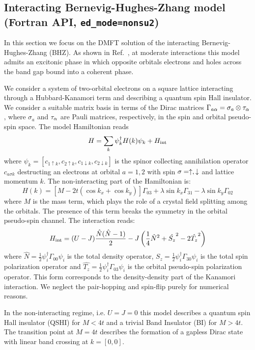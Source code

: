 \documentclass[edipack2.tex]{subfiles}
\begin{document}
\subsection{Interacting Bernevig-Hughes-Zhang model (Fortran API, {\tt ed\_mode=nonsu2})}
In this section we focus on the DMFT solution of the interacting
Bernevig-Hughes-Zhang (BHZ).
As shown in Ref.~, at moderate
interactions this model admits an excitonic phase in which opposite
orbitals electrons and holes across the band gap bound into a coherent phase.

We consider a system of two-orbital electrons on a square
lattice interacting through a Hubbard-Kanamori term and describing
a quantum spin Hall insulator.
We consider a suitable matrix basis in terms of the Dirac
matrices $\Gamma_{a\alpha}=\sigma_a\otimes \tau_\alpha$, where $\sigma_a$ and
$\tau_\alpha$ are Pauli matrices, respectively, in the spin and orbital
pseudo-spin space. The  model Hamiltonian reads
$$
H = \sum_{k}\psi_{k}^\dagger H(k)\psi_{k} + H_{\rm int}
$$
where $\psi_{k}=[c_{1\uparrow k}, c_{2\uparrow k},
c_{1\downarrow k}, c_{2\downarrow k} ]$ is the spinor collecting
annihilation operator $c_{a\sigma k}$ destructing an electrons at
orbital $a=1,2$ with spin  $\sigma=\uparrow,\downarrow$ and lattice momentum
$k$. The non-interacting part of the Hamiltonian is:
$$
H(k) = \left[M-2t(\cos{k_x}+\cos{k_y}) \right]\Gamma_{03} +
   \lambda\sin{k_x}\Gamma_{31} -   \lambda\sin{k_y}\Gamma_{02}
$$
where $M$ is the mass term, which plays the role of a crystal
field splitting among the orbitals. The presence of this term breaks
the symmetry in the orbital pseudo-spin channel.
The  interaction reads: 
$$
   H_{\rm int} = (U-J)\frac{\hat{N}(\hat{N}-1)}{2} - J\left( \frac{1}{4}\hat{N}^2 +
   \hat{S_z}^2 - 2 \hat{T_z}^2\right)
 $$
 where $\hat{N}=\tfrac{1}{2}\psi_i^\dagger \Gamma_{00}\psi_i$ is the
total density operator,
$\hat{S_z}=\tfrac{1}{2}\psi_i^\dagger \Gamma_{30}\psi_i$ is the total
spin polarization operator and $\hat{T_z}=\tfrac{1}{2}\psi_i^\dagger
\Gamma_{03}\psi_i$ is the orbital pseudo-spin polarization operator.
This form corresponds to the density-density part of the
Kanamori interaction. We neglect the pair-hopping and spin-flip purely
for numerical reasons. 

In the non-interacting regime, i.e. $U=J=0$ this model describes a
quantum spin Hall insulator (QSHI) for $M<4t$ and a trivial Band
Insulator (BI) for $M>4t$.
The transition point at $M=4t$ describes the formation of a gapless
Dirac state with linear band crossing at $k=[0,0]$.  
\end{document}
